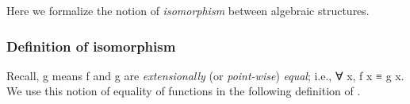 Here we formalize the notion of \emph{isomorphism} between algebraic structures.

\subsubsection{Definition of isomorphism}\label{definition-of-isomorphism}

Recall,   \ab g means \ab f and \ab g are   %
\emph{extensionally} (or \emph{point-wise}) \emph{equal}; i.e., \as ∀ \ab x, \ab f \ab x \aod ≡ \ab g \ab x. We use this notion of equality of functions in the following definition of .
\ccpad
\begin{code}%
\>[0]\AgdaSpace{}%
\AgdaSymbol{:}\AgdaSpace{}%
\AgdaSymbol{\{}\AgdaSpace{}%
\AgdaSpace{}%
\AgdaSymbol{:}\AgdaSpace{}%
\AgdaSymbol{\}(}\AgdaSpace{}%
\AgdaSymbol{:}\AgdaSpace{}%
\AgdaSpace{}%
\AgdaSpace{}%
\AgdaSymbol{)(}\AgdaSpace{}%
\AgdaSymbol{:}\AgdaSpace{}%
\AgdaSpace{}%
\AgdaSpace{}%
\AgdaSymbol{)}\AgdaSpace{}%
\AgdaSpace{}%
\AgdaSpace{}%
\AgdaSpace{}%
\AgdaSpace{}%
\AgdaSpace{}%
\AgdaSpace{}%
\AgdaSpace{}%
\AgdaSpace{}%
\<%
\\
\>[0]\AgdaSpace{}%
\AgdaSpace{}%
\AgdaSpace{}%
\AgdaSymbol{=}%
\>[9]\AgdaSpace{}%
\AgdaSpace{}%
\AgdaSpace{}%
\AgdaSymbol{(}\AgdaSpace{}%
\AgdaSpace{}%
\AgdaSymbol{)}\AgdaSpace{}%
\AgdaFunction{,}\AgdaSpace{}%
\AgdaSpace{}%
\AgdaSpace{}%
\AgdaSpace{}%
\AgdaSymbol{(}\AgdaSpace{}%
\AgdaSpace{}%
\AgdaSymbol{)}%
\>[73I]\AgdaFunction{,}\AgdaSpace{}%
\AgdaSymbol{(}\AgdaSpace{}%
\AgdaSpace{}%
\AgdaSpace{}%
\AgdaSpace{}%
\AgdaSpace{}%
\AgdaSpace{}%

\end{code}
